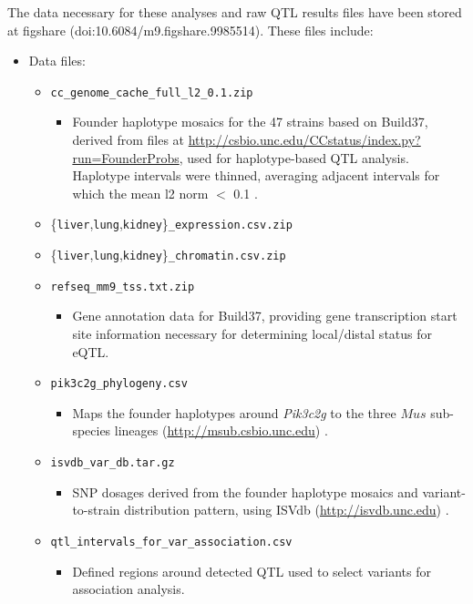 \documentclass[10pt,letterpaper,twoside]{article}
\begin{document}
\noindent The data necessary for these analyses and raw QTL results files have been stored at figshare (doi:10.6084/m9.figshare.9985514). These files include:

\begin{itemize}
	\item Data files:
	\begin{itemize}
		\item \texttt{cc\_genome\_cache\_full\_l2\_0.1.zip}
		\begin{itemize}
			\item Founder haplotype mosaics for the 47 strains based on Build37, derived from files at \url{http://csbio.unc.edu/CCstatus/index.py?run=FounderProbs}, used for haplotype-based QTL analysis. Haplotype intervals were thinned, averaging adjacent intervals for which the mean l2 norm $<$ 0.1 \cite{Keele2019}.
		\end{itemize}
		\item \{\texttt{liver},\texttt{lung},\texttt{kidney}\}\texttt{\_expression.csv.zip}
		\item \{\texttt{liver},\texttt{lung},\texttt{kidney}\}\texttt{\_chromatin.csv.zip}
		\item \texttt{refseq\_mm9\_tss.txt.zip}
		\begin{itemize}
			\item Gene annotation data for Build37, providing gene transcription start site information necessary for determining local/distal status for eQTL. 
		\end{itemize}
		\item \texttt{pik3c2g\_phylogeny.csv}
		\begin{itemize}
			\item Maps the founder haplotypes around \textit{Pik3c2g} to the three $\textit{Mus}$ sub-species lineages (\url{http://msub.csbio.unc.edu}) \cite{Wang2012}.
		\end{itemize}
		\item \texttt{isvdb\_var\_db.tar.gz}
		\begin{itemize}
			\item SNP dosages derived from the founder haplotype mosaics and variant-to-strain distribution pattern, using ISVdb (\url{http://isvdb.unc.edu}) \cite{Oreper2017}.
		\end{itemize}
		\item \texttt{qtl\_intervals\_for\_var\_association.csv}
		\begin{itemize}
			\item Defined regions around detected QTL used to select variants for association analysis.

\end{itemize}
\end{itemize}
\end{itemize}
\end{document}
